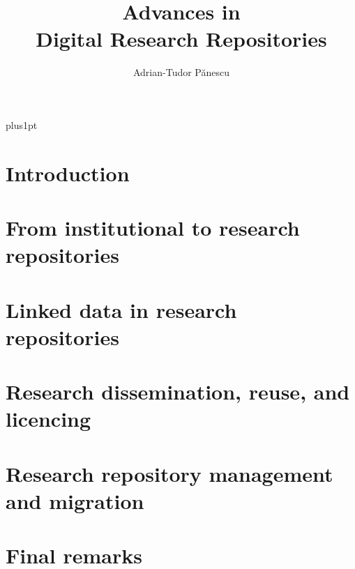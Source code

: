 \documentclass[12pt]{ociamthesis}  %
\title{Advances in\\[1ex]     %
        Digital Research Repositories}   %
\author{Adrian-Tudor P\u{a}nescu}             %
\begin{document}
\baselineskip=18pt plus1pt

\setcounter{secnumdepth}{3}
\setcounter{tocdepth}{3}


\maketitle                  %



\begin{romanpages}          %
\tableofcontents            %
\printglossary[type=\acronymtype,title=Abbreviations]

\end{romanpages}            %

\chapter{Introduction}
\label{ch:intro}


\chapter{From institutional to research repositories}
\label{ch:evolution}


\chapter{Linked data in research repositories}
\label{ch:rdf}


\chapter{Research dissemination, reuse, and licencing}

\chapter{Research repository management and migration}

\chapter{Final remarks}

\printbibliography

%

\renewcommand{\bibname}{References}
\end{document}
